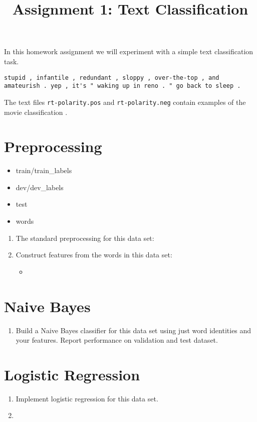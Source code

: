 \documentclass{article}
\title{Assignment 1: Text Classification}
\begin{document}
In this homework assignment we will experiment with a simple text 
classification task. 

\begin{verbatim}
stupid , infantile , redundant , sloppy , over-the-top , and amateurish . yep , it's " waking up in reno . " go back to sleep . 
\end{verbatim}


The text files \texttt{rt-polarity.pos} and \texttt{rt-polarity.neg} contain
examples of the movie classification \cite{}.



\section{Preprocessing}

\begin{itemize}
\item train/train_labels
\item dev/dev_labels
\item test
\item words
\end{itemize}

\begin{enumerate}
\item The standard preprocessing for this data set: 

\item Construct features from the words in this data set:

  \begin{itemize}
  \item 
  \end{itemize}
\end{enumerate}

\section{Naive Bayes}

\begin{enumerate}
\item Build a Naive Bayes classifier for this data set using just word
  identities and your features. Report performance on validation and test dataset.
\end{enumerate}

\section{Logistic Regression}

\begin{enumerate}
\item Implement logistic regression for this data set.
\item 

\end{enumerate}
\end{document}

